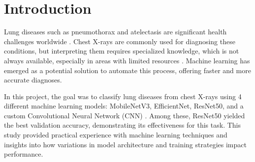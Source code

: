 \documentclass[journal]{IEEEtran}
\begin{document}

\section{Introduction}

Lung diseases such as pneumothorax and atelectasis are significant health challenges worldwide \cite{med-student-koroglu}. Chest X-rays are commonly used for diagnosing these conditions, but interpreting them requires specialized knowledge, which is not always available, especially in areas with limited resources \cite{dr-kazazi}. Machine learning has emerged as a potential solution to automate this process, offering faster and more accurate diagnoses.

In this project, the goal was to classify lung diseases from chest X-rays using 4 different machine learning models: MobileNetV3, EfficientNet, ResNet50, and a custom Convolutional Neural Network (CNN) \cite{keras-api}. Among these, ResNet50 yielded the best validation accuracy, demonstrating its effectiveness for this task. This study provided practical experience with machine learning techniques and insights into how variations in model architecture and training strategies impact performance.
\end{document}
